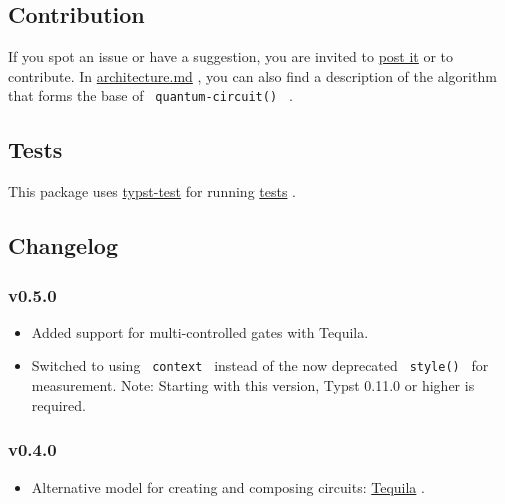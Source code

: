 
\subsection{Contribution}\label{contribution}

If you spot an issue or have a suggestion, you are invited to
\href{https://github.com/Mc-Zen/quill/issues}{post it} or to contribute.
In
\href{https://github.com/Mc-Zen/quill/tree/v0.5.0/docs/architecture.md}{architecture.md}
, you can also find a description of the algorithm that forms the base
of \texttt{\ quantum-circuit()\ } .

\subsection{Tests}\label{tests}

This package uses
\href{https://github.com/tingerrr/typst-test/}{typst-test} for running
\href{https://github.com/Mc-Zen/quill/tree/v0.5.0/tests/}{tests} .

\subsection{Changelog}\label{changelog}

\subsubsection{v0.5.0}\label{v0.5.0}

\begin{itemize}
\tightlist
\item
  Added support for multi-controlled gates with Tequila.
\item
  Switched to using \texttt{\ context\ } instead of the now deprecated
  \texttt{\ style()\ } for measurement. Note: Starting with this
  version, Typst 0.11.0 or higher is required.
\end{itemize}

\subsubsection{v0.4.0}\label{v0.4.0}

\begin{itemize}
\tightlist
\item
  Alternative model for creating and composing circuits:
  \href{https://github.com/typst/packages/raw/main/packages/preview/quill/0.5.0/\#tequila}{Tequila}
  .
\end{itemize}

